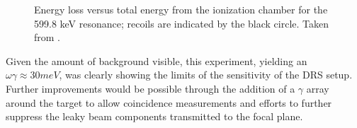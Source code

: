 \begin{figure}
\begin{center}
\caption{Energy loss versus total energy from the ionization chamber for the 599.8 keV resonance;  recoils are indicated by the black circle. Taken from \cite{chip09a}.}
\label{fig:chipp09a_3}
\end{center}
\end{figure}
Given the amount of background visible, this experiment, yielding an $\omega\gamma \approx 30 \unit{meV}$, was clearly showing the limits of the sensitivity of the DRS setup. Further improvements would be possible through the addition of a $\gamma$ array around the target to allow coincidence measurements and efforts to further suppress the leaky beam components transmitted to the focal plane.


